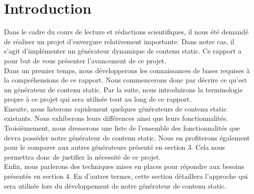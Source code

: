 \section{Introduction}

	Dans le cadre du cours de lecture et rédactions scientifiques, il nous été demandé de réaliser un projet d'envergure relativement importante. Dans notre cas, il s'agit d'implémenter un générateur dynamique de contenu static. Ce rapport a pour but de vous présenter l'avancement de ce projet.\\
	
	Dans un premier temps, nous développerons les connaissances de bases requises à la compréhensions de ce rapport. Nous commencerons donc par décrire ce qu'est un générateur de contenu static. Par la suite, nous introduirons la terminologie propre à ce projet qui sera utilisée tout au long de ce rapport.\\
	
	Ensuite, nous listerons rapidement quelques générateurs de contenu static existants. Nous exhiberons leurs différences ainsi que leurs fonctionnalités.\\
	
	Troisièmement, nous dresserons une liste de l'ensemble des fonctionnalités que devra posséder notre générateur de contenu static. Nous en profiterons également pour le comparer aux autres générateurs présenté en section 3. Cela nous permettra donc de justifier la nécessité de ce projet.\\
	
	Enfin, nous parlerons des techniques mises en places pour répondre aux besoins présentés en section 4. En d'autres termes, cette section détaillera l'approche qui sera utilisée lors du développement de notre générateur de contenu static.

	